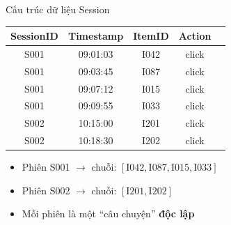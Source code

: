 \documentclass[aspectratio=169, 11pt]{beamer}
\begin{document}
\begin{frame}{Cấu trúc dữ liệu Session}
\begin{table}
\centering
\small
\begin{tabular}{ccccc}
\toprule
\textbf{SessionID} & \textbf{Timestamp} & \textbf{ItemID} & \textbf{Action} \\
\midrule
S001 & 09:01:03 & I042 & click \\
S001 & 09:03:45 & I087 & click \\
S001 & 09:07:12 & I015 & click \\
S001 & 09:09:55 & I033 & click \\
\midrule
S002 & 10:15:00 & I201 & click \\
S002 & 10:18:30 & I202 & click \\
\bottomrule
\end{tabular}
\end{table}

\vspace{0.3cm}
\begin{itemize}
    \item Phiên S001 $\rightarrow$ chuỗi: $[\text{I042}, \text{I087}, \text{I015}, \text{I033}]$
    \item Phiên S002 $\rightarrow$ chuỗi: $[\text{I201}, \text{I202}]$
    \item Mỗi phiên là một ``câu chuyện'' \textbf{độc lập}
\end{itemize}
\end{frame}
\end{document}
